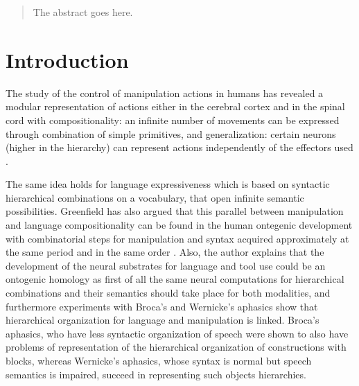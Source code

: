 \documentclass[conference]{include/IEEEtran}
\begin{document}
\begin{abstract}
The abstract goes here.
\end{abstract}





%
\IEEEpeerreviewmaketitle



\section{Introduction}

	
	The study of the control of manipulation actions in humans has revealed a modular representation of actions 
	either in the cerebral cortex and in the spinal 
	cord with compositionality: an infinite number of movements can be expressed through combination of simple primitives, 
	and generalization: certain neurons (higher 
	in the hierarchy) can represent actions independently of the effectors used \cite{cangelosi2010integration}.
	
	The same idea holds for language expressiveness which is based on syntactic hierarchical combinations 
	on a vocabulary, that open infinite semantic possibilities. 
	Greenfield has also argued that this parallel between manipulation and language compositionality can be found in the human ontegenic development
	with combinatorial steps for manipulation and syntax acquired approximately at the same period and in the same order \cite{green}. 
	Also, the author explains that the development of the neural substrates for language and tool use could be an ontogenic homology as first of all
	the same neural computations for hierarchical combinations and their semantics should take place for both modalities, and furthermore 
	experiments with Broca's and Wernicke's aphasics show that hierarchical organization for language and manipulation is linked. 
	Broca's aphasics, who have less syntactic organization of speech were shown to also have problems of representation of the hierarchical organization
	of constructions with blocks, whereas Wernicke's aphasics, whose syntax is normal but speech semantics is impaired, succeed in representing such objects 
	hierarchies. 
	
\end{document}
